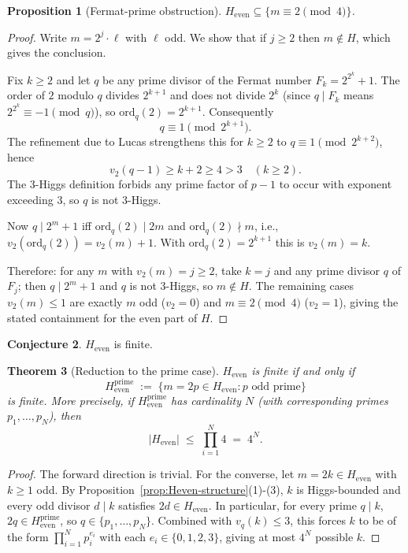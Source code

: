 \documentclass[11pt]{amsart}
\theoremstyle{plain}
\newtheorem{theorem}{Theorem}
\newtheorem{proposition}[theorem]{Proposition}
\theoremstyle{definition}
\newtheorem{conjecture}[theorem]{Conjecture}
\begin{document}
\begin{proposition}[Fermat-prime obstruction]\label{prop:Heven-dyadic}
$H_{\mathrm{even}} \subseteq \{ m \equiv 2 \pmod 4 \}$.
\end{proposition}

\begin{proof}
Write $m = 2^j \cdot \ell$ with $\ell$ odd. We show that if $j \ge 2$
then $m \notin H$, which gives the conclusion.

Fix $k \ge 2$ and let $q$ be any prime divisor of the Fermat number
$F_k = 2^{2^k} + 1$. The order of $2$ modulo $q$ divides $2^{k+1}$ and
does not divide $2^k$ (since $q \mid F_k$ means $2^{2^k} \equiv -1
\pmod q$), so $\mathrm{ord}_q(2) = 2^{k+1}$. Consequently
\[
q \equiv 1 \pmod{2^{k+1}}.
\]
The refinement due to Lucas strengthens this for $k \ge 2$ to
$q \equiv 1 \pmod{2^{k+2}}$, hence
\[
v_2(q - 1) \ge k + 2 \ge 4 > 3 \quad (k \ge 2).
\]
The 3-Higgs definition forbids any prime factor of $p - 1$ to occur
with exponent exceeding $3$, so $q$ is not 3-Higgs.

Now $q \mid 2^m + 1$ iff $\mathrm{ord}_q(2) \mid 2m$ and
$\mathrm{ord}_q(2) \nmid m$, i.e., $v_2(\mathrm{ord}_q(2)) = v_2(m) + 1$.
With $\mathrm{ord}_q(2) = 2^{k+1}$ this is $v_2(m) = k$.

Therefore: for any $m$ with $v_2(m) = j \ge 2$, take $k = j$ and any
prime divisor $q$ of $F_j$; then $q \mid 2^m + 1$ and $q$ is not
3-Higgs, so $m \notin H$. The remaining cases $v_2(m) \le 1$ are
exactly $m$ odd ($v_2 = 0$) and $m \equiv 2 \pmod 4$ ($v_2 = 1$),
giving the stated containment for the even part of $H$.
\end{proof}

\begin{conjecture}\label{conj:Heven-finite}
$H_{\mathrm{even}}$ is finite.
\end{conjecture}

\begin{theorem}[Reduction to the prime case]\label{thm:prime-reduction}
$H_{\mathrm{even}}$ is finite if and only if
\[
H_{\mathrm{even}}^{\mathrm{prime}} \;:=\;
\{m = 2p \in H_{\mathrm{even}} : p \text{ odd prime}\}
\]
is finite. More precisely, if $H_{\mathrm{even}}^{\mathrm{prime}}$
has cardinality $N$ (with corresponding primes $p_1, \dots, p_N$),
then
\[
|H_{\mathrm{even}}| \;\le\; \prod_{i=1}^{N} 4 \;=\; 4^{N}.
\]
\end{theorem}

\begin{proof}
The forward direction is trivial. For the converse, let $m = 2k \in
H_{\mathrm{even}}$ with $k \ge 1$ odd. By
Proposition~\ref{prop:Heven-structure}(1)-(3), $k$ is Higgs-bounded
and every odd divisor $d \mid k$ satisfies $2d \in H_{\mathrm{even}}$.
In particular, for every prime $q \mid k$, $2q \in
H_{\mathrm{even}}^{\mathrm{prime}}$, so $q \in
\{p_1, \dots, p_N\}$. Combined with $v_q(k) \le 3$, this forces
$k$ to be of the form $\prod_{i=1}^N p_i^{e_i}$ with each $e_i \in
\{0,1,2,3\}$, giving at most $4^N$ possible $k$.
\end{proof}
\end{document}
